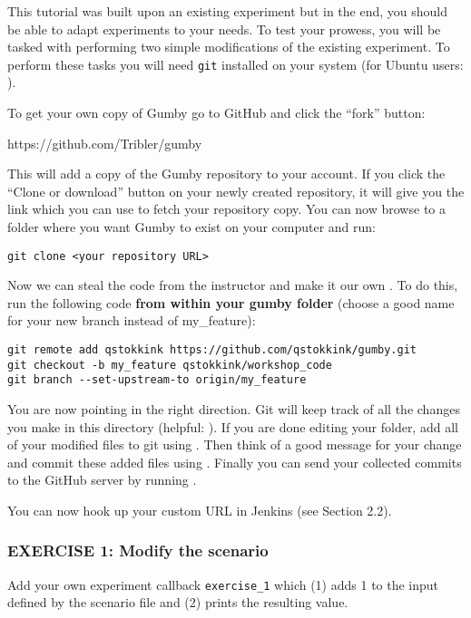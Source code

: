 \documentclass{article}
\begin{document}
This tutorial was built upon an existing experiment but in the end, you should be able to adapt experiments to your needs.
To test your prowess, you will be tasked with performing two simple modifications of the existing experiment.
To perform these tasks you will need \texttt{git} installed on your system (for Ubuntu users: ).

\noindent To get your own copy of Gumby go to GitHub and click the ``fork'' button:

https://github.com/Tribler/gumby

\noindent This will add a copy of the Gumby repository to your account.
If you click the ``Clone or download'' button on your newly created repository, it will give you the link which you can use to fetch your repository copy.
You can now browse to a folder where you want Gumby to exist on your computer and run:

\begin{lstlisting}[frame=single]
git clone <your repository URL>
\end{lstlisting}

Now we can steal the code from the instructor and make it our own .
To do this, run the following code \textbf{from within your gumby folder} (choose a good name for your new branch instead of my\_feature):
\begin{lstlisting}[frame=single]
git remote add qstokkink https://github.com/qstokkink/gumby.git
git checkout -b my_feature qstokkink/workshop_code
git branch --set-upstream-to origin/my_feature
\end{lstlisting}

You are now pointing in the right direction.
Git will keep track of all the changes you make in this directory (helpful: ).
If you are done editing your folder, add all of your modified files to git using .
Then think of a good message for your change and commit these added files using .
Finally you can send your collected commits to the GitHub server by running .

You can now hook up your custom URL in Jenkins (see Section 2.2).

\subsubsection{EXERCISE 1: Modify the scenario}
Add your own experiment callback \texttt{exercise\_1} which (1) adds 1 to the input defined by the scenario file and (2) prints the resulting value.
\end{document}
